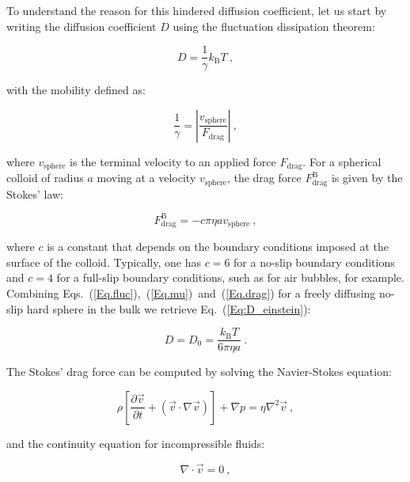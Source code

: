 To understand the reason for this hindered diffusion coefficient, let us start by writing the diffusion coefficient $D$ using the fluctuation dissipation theorem:

\begin{equation}
	D = \frac{1}{\gamma} k_\mathrm{B}T ~,
	\label{Eq.fluc}
\end{equation}

with the mobility defined as:

\begin{equation}
	\frac{1}{\gamma} = \left| \frac{v_\mathrm{sphere}}{F_\mathrm{drag}} \right|~,
	\label{Eq.mu}
\end{equation}

where $v_\mathrm{sphere}$ is the terminal velocity to an applied force $F_\mathrm{drag}$. For a spherical colloid of radius $a$ moving at a velocity $v_\mathrm{sphere}$, the drag force $F_{\mathrm{drag}} ^\mathrm{B}$ is given by the Stokes' law:

\begin{equation}
	F_\mathrm{drag} ^\mathrm{B} = -c \pi \eta a v_\mathrm{sphere} ~,
	\label{Eq.drag}
\end{equation}

where $c$ is a constant that depends on the boundary conditions imposed at the surface of the colloid. Typically, one has $c = 6$ for a no-slip boundary conditions and $c = 4$ for a full-slip boundary conditions, such as for air bubbles, for example. Combining Eqs.~(\ref{Eq.fluc}),~(\ref{Eq.mu})~and~(\ref{Eq.drag}) for a freely diffusing no-slip hard sphere in the bulk we retrieve Eq.~(\ref{Eq:D_einstein}): 

\begin{equation}
	D = D_0 = \frac{k_\mathrm{B}T}{6\pi \eta a} ~.
	\label{Eq.D}
\end{equation}

The Stokes' drag force can be computed by solving the Navier-Stokes equation:

\begin{equation}
	\rho \left[ \frac{\partial \vec{v}}{\partial t} + \left(\vec{v} \cdot \nabla \vec{v} \right) \right] + \nabla p = \eta \nabla ^2 \vec{v} ~,
	\label{Eq.Navier}
\end{equation}

and the continuity equation for incompressible fluids:

\begin{equation}
	\nabla \cdot \vec{v} = 0~,
	\label{Eq.continuity}
\end{equation}

